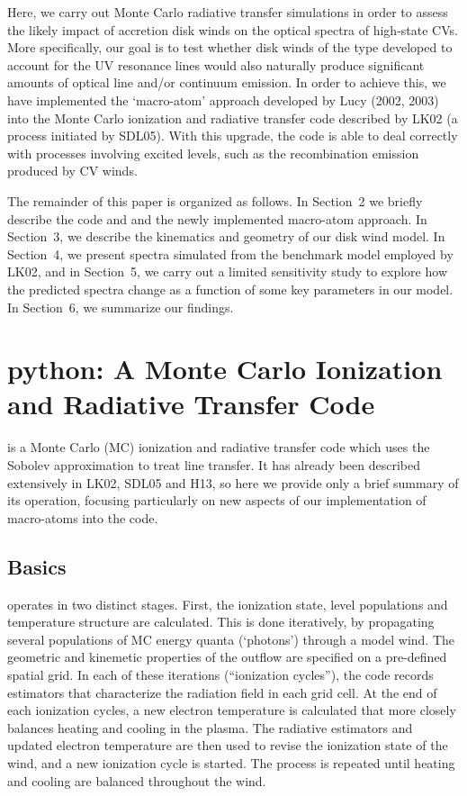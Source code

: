 \documentclass[preprint, a4paper, 11pt]{aastex}
\begin{document}
Here, we carry out Monte Carlo radiative transfer simulations in
order to assess the likely impact of accretion disk winds on the
optical spectra of high-state CVs. More specifically, our goal is to
test whether disk winds of the type developed to account for the UV
resonance lines would also naturally produce significant amounts of  
optical line and/or continuum emission. In order to achieve this, we
have implemented the `macro-atom' approach developed by Lucy
(2002, 2003) into the Monte Carlo ionization and radiative transfer
code described by LK02 (a process initiated by SDL05). With this
upgrade, the code is able to deal correctly with processes involving
excited levels, such as the recombination emission produced by CV
winds. 

The remainder of this paper is organized as follows. In Section~2 we
briefly describe the code and and the newly implemented macro-atom
approach. In Section~3, we describe the kinematics and geometry of our
disk wind model. 
In Section~4, we present spectra simulated from the benchmark model
employed by LK02, and in Section~5, we carry out a limited sensitivity
study to explore how the predicted spectra change as a function of
some key parameters in our model. In Section~6, we summarize our
findings.


%
%

\section{{\sc python}: A Monte Carlo Ionization and Radiative Transfer Code}

\py is a Monte Carlo (MC) ionization and radiative transfer code which
uses the Sobolev approximation to treat line transfer. It has already
been described extensively in LK02, SDL05 and H13, so here we provide
only a brief summary of its operation, focusing particularly on new
aspects of our implementation of macro-atoms into the code. 

\subsection{Basics} 

\py operates in two distinct stages. First, the ionization state,
level populations and temperature structure are calculated. This is
done iteratively, by 
propagating several populations of MC energy quanta (`photons')
through a model wind. The geometric and kinemetic properties of the
outflow are specified on a pre-defined spatial grid. In each of these
iterations (``ionization cycles''), the code records estimators that 
characterize the radiation field in each grid cell. At the end 
of each ionization cycles, a new electron temperature is calculated
that more closely balances heating and cooling in the 
plasma. The radiative estimators and updated electron
temperature are then used to revise the ionization state of the wind,
and a new ionization cycle is started. The process is repeated until
heating and cooling are balanced throughout the wind. 
\end{document}
